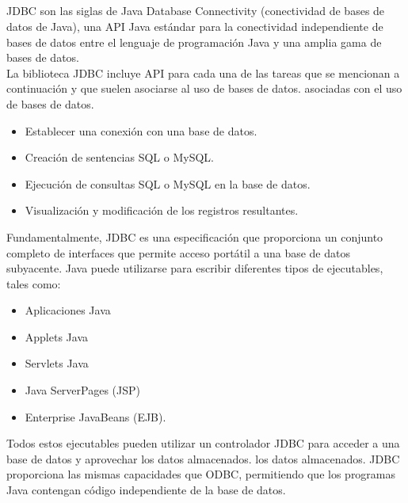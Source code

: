 \documentclass[10pt,a4paper]{article}
\begin{document}
\subsection{\color{colorGENERICO}{JDBC}}
\normalsize{
JDBC son las siglas de Java Database Connectivity (conectividad de bases de datos de Java), una API Java estándar para la conectividad independiente de bases de datos entre el lenguaje de programación Java y una amplia gama de bases de datos.
\\
La biblioteca JDBC incluye API para cada una de las tareas que se mencionan a continuación y que suelen asociarse al uso de bases de datos.
asociadas con el uso de bases de datos.
\begin{itemize}
\item{Establecer una conexión con una base de datos.}
\item{Creación de sentencias SQL o MySQL.}
\item{Ejecución de consultas SQL o MySQL en la base de datos.}
\item{Visualización y modificación de los registros resultantes.}
\end{itemize}

Fundamentalmente, JDBC es una especificación que proporciona un conjunto completo de interfaces que permite acceso portátil a una base de datos subyacente. Java puede utilizarse para escribir diferentes tipos de ejecutables, tales como:
\begin{itemize}
\item Aplicaciones Java
\item Applets Java
\item Servlets Java
\item Java ServerPages (JSP)
\item Enterprise JavaBeans (EJB).
\end{itemize}


Todos estos ejecutables pueden utilizar un controlador JDBC para acceder a una base de datos y aprovechar los datos almacenados.
los datos almacenados.
JDBC proporciona las mismas capacidades que ODBC, permitiendo que los programas Java contengan código independiente de la base de datos.
\\
\\

}
\end{document}
